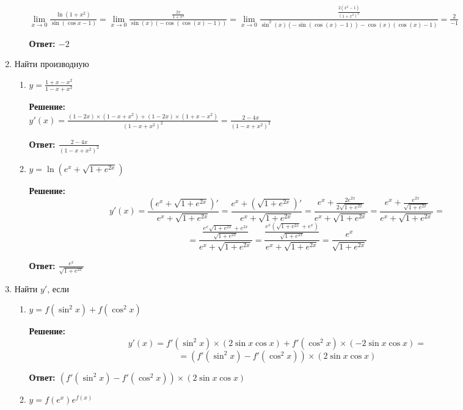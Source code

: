 \documentclass[a4paper,12pt]{article}
\begin{document}
\begin{enumerate}
\begin{enumerate}
$
\lim\limits_{x\to 0}\frac{\ln(1 + x^2)}{\sin(\cos x - 1)}=\lim\limits_{x\to 0}\frac{\frac{2x}{1+x^2}}{\sin(x) (-\cos(\cos (x )-1 ))}=\lim\limits_{x\to 0}\frac{\frac{2(x^2 -1)}{(1+x^2)^2}}{\sin^2(x) (-\sin(\cos(x) -1 )) - \cos(x)( \cos(x) - 1)} = \frac{2}{-1}
$

\textbf{Ответ: $-2$}

\end{enumerate}


\item Найти производную
\begin{enumerate}
\item
$
y = \frac{1 + x - x^2}{1 - x + x^2}
$

\textbf{Решение:} \\
$y'(x) = \frac{(1-2x)\times(1 - x + x^2)+(1-2x)\times(1 + x - x^2)}{(1 - x + x^2)^2}=\frac{2-4x}{(1 - x + x^2)^2}$

\textbf{Ответ: $\frac{2-4x}{(1 - x + x^2)^2}$}

\item 
$
y = \ln(e^x + \sqrt{1 + e^{2x}})
$

\textbf{Решение:} \\
$$y'(x) = \frac{(e^x + \sqrt{1 + e^{2x}})'}{e^x + \sqrt{1 + e^{2x}}}=\frac{e^x + (\sqrt{1 + e^{2x}})'}{e^x + \sqrt{1 + e^{2x}}}=\frac{e^x + \frac{2e^{2x}}{2\sqrt{1 + e^{2x}}}}{e^x + \sqrt{1 + e^{2x}}}=\frac{e^{x} + \frac{e^{2x}}{\sqrt{1 + e^{2x}}}}{e^x + \sqrt{1 + e^{2x}}}=$$
$$=\frac{ \frac{e^{x}\sqrt{1 + e^{2x}}+e^{2x}}{\sqrt{1 + e^{2x}}}}{e^x + \sqrt{1 + e^{2x}}}=\frac{ \frac{e^{x}(\sqrt{1 + e^{2x}}+e^{x})}{\sqrt{1 + e^{2x}}}}{e^x + \sqrt{1 + e^{2x}}}=\frac{e^{x}}{\sqrt{1 + e^{2x}}}$$

\textbf{Ответ: $\frac{e^{x}}{\sqrt{1 + e^{2x}}}$}


\end{enumerate}

\item Найти $y'$, если
\begin{enumerate}
\item $y = f(\sin^2 x) + f(\cos^2 x)$

\textbf{Решение:} \\
$$y'(x) =f'(\sin^2 x)\times (2 \sin x \cos x)+ f'(\cos^2 x)\times (-2 \sin x \cos x)=$$
$$ =(f'(\sin^2 x)-f'(\cos^2 x))\times (2 \sin x \cos x)$$


\textbf{Ответ: $(f'(\sin^2 x)-f'(\cos^2 x))\times (2 \sin x \cos x)$}


\item $y = f(e^x) e^{f(x)}$


\end{enumerate}
\end{enumerate}
\end{document}
